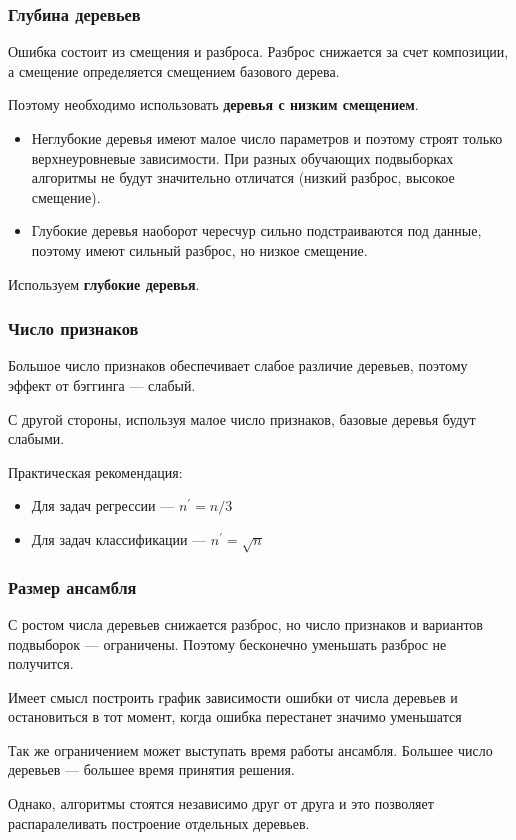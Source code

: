 \documentclass{beamer}
\begin{document}
	\begin{frame}
		\frametitle{Глубина деревьев}

		Ошибка состоит из смещения и разброса.
		Разброс снижается за счет композиции, а смещение определяется смещением базового дерева.

		Поэтому необходимо использовать \textbf{деревья с низким смещением}.
		\begin{itemize}
			\item Неглубокие деревья имеют малое число параметров и поэтому строят только верхнеуровневые зависимости.
			При разных обучающих подвыборках алгоритмы не будут значительно отличатся (низкий разброс, высокое смещение).
			\item Глубокие деревья наоборот чересчур сильно подстраиваются под данные, поэтому имеют сильный разброс, но низкое смещение.
		\end{itemize}
		\vspace{15pt}

		Используем \textbf{глубокие деревья}.
	\end{frame}

	\begin{frame}
		\frametitle{Число признаков}

		Большое число признаков обеспечивает слабое различие деревьев, поэтому эффект
		от бэггинга --- слабый.

		С другой стороны, используя малое число признаков, базовые деревья будут слабыми.

		\vspace{15pt}

		Практическая рекомендация:
		\begin{itemize}
			\item Для задач регрессии --- $n^{'} = n / 3$
			\item Для задач классификации --- $n^{'} = \sqrt{n}$
		\end{itemize}
	\end{frame}

	\begin{frame}
		\frametitle{Размер ансамбля}

		С ростом числа деревьев снижается разброс, но число признаков и вариантов подвыборок --- ограничены.
		Поэтому бесконечно уменьшать разброс не получится.

		\vspace{15pt}

		Имеет смысл построить график зависимости ошибки от числа деревьев и остановиться в тот момент, когда
		ошибка перестанет значимо уменьшатся

		\vspace{15pt}

		Так же ограничением может выступать время работы ансамбля. Большее число деревьев --- большее время принятия решения.

		Однако, алгоритмы стоятся независимо друг от друга и это позволяет распаралеливать построение отдельных деревьев.
	\end{frame}
\end{document}
